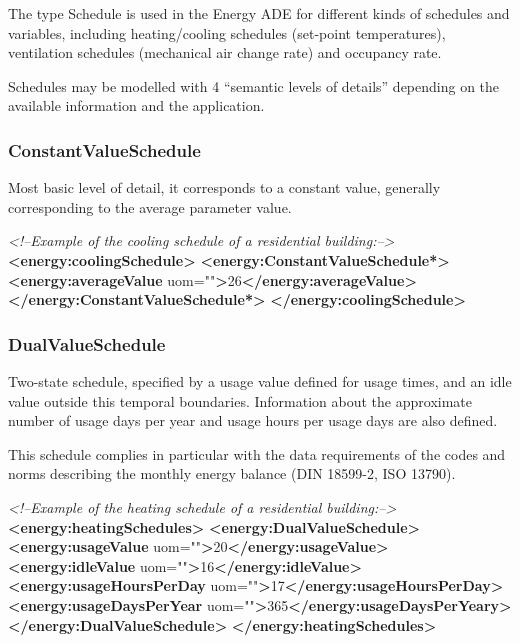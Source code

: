 \documentclass[a4paper,12pt]{article}
\newenvironment{Shaded}{}{}
\newcommand{\KeywordTok}[1]{\textcolor[rgb]{0.00,0.44,0.13}{\textbf{{#1}}}}
\newcommand{\StringTok}[1]{\textcolor[rgb]{0.25,0.44,0.63}{{#1}}}
\newcommand{\CommentTok}[1]{\textcolor[rgb]{0.38,0.63,0.69}{\textit{{#1}}}}
\newcommand{\OtherTok}[1]{\textcolor[rgb]{0.00,0.44,0.13}{{#1}}}
\newcommand{\ErrorTok}[1]{\textcolor[rgb]{1.00,0.00,0.00}{\textbf{{#1}}}}
\newcommand{\NormalTok}[1]{{#1}}
\begin{document}
The type Schedule is used in the Energy ADE for different kinds of
schedules and variables, including heating/cooling schedules (set-point
temperatures), ventilation schedules (mechanical air change rate) and
occupancy rate.

Schedules may be modelled with 4 ``semantic levels of details''
depending on the available information and the application.

\subsubsection{ConstantValueSchedule}\label{constantvalueschedule}

Most basic level of detail, it corresponds to a constant value,
generally corresponding to the average parameter value.

\begin{Shaded}
\begin{Highlighting}[]
\CommentTok{<!--Example of the cooling schedule of a residential building:-->}
\KeywordTok{<energy:coolingSchedule>}
    \KeywordTok{<energy:ConstantValueSchedule}\ErrorTok{*}\KeywordTok{>}
        \KeywordTok{<energy:averageValue}\OtherTok{ uom=}\StringTok{""}\KeywordTok{>}\NormalTok{26}\KeywordTok{</energy:averageValue>}
    \KeywordTok{</energy:ConstantValueSchedule}\ErrorTok{*}\KeywordTok{>}
\KeywordTok{</energy:coolingSchedule>}
\end{Highlighting}
\end{Shaded}

\subsubsection{DualValueSchedule}\label{dualvalueschedule}

Two-state schedule, specified by a usage value defined for usage times,
and an idle value outside this temporal boundaries. Information about
the approximate number of usage days per year and usage hours per usage
days are also defined.

This schedule complies in particular with the data requirements of the
codes and norms describing the monthly energy balance (DIN 18599-2, ISO
13790).

\begin{Shaded}
\begin{Highlighting}[]
\CommentTok{<!--Example of the heating schedule of a residential building:-->}
\KeywordTok{<energy:heatingSchedules>}
    \KeywordTok{<energy:DualValueSchedule>}
        \KeywordTok{<energy:usageValue}\OtherTok{ uom=}\StringTok{""}\KeywordTok{>}\NormalTok{20}\KeywordTok{</energy:usageValue>}
        \KeywordTok{<energy:idleValue}\OtherTok{ uom=}\StringTok{""}\KeywordTok{>}\NormalTok{16}\KeywordTok{</energy:idleValue>}
        \KeywordTok{<energy:usageHoursPerDay}\OtherTok{ uom=}\StringTok{""}\KeywordTok{>}\NormalTok{17}\KeywordTok{</energy:usageHoursPerDay>}
        \KeywordTok{<energy:usageDaysPerYear}\OtherTok{ uom=}\StringTok{""}\KeywordTok{>}\NormalTok{365}\KeywordTok{</energy:usageDaysPerYeary>}
    \KeywordTok{</energy:DualValueSchedule>}
\KeywordTok{</energy:heatingSchedules>}
\end{Highlighting}
\end{Shaded}
\end{document}
